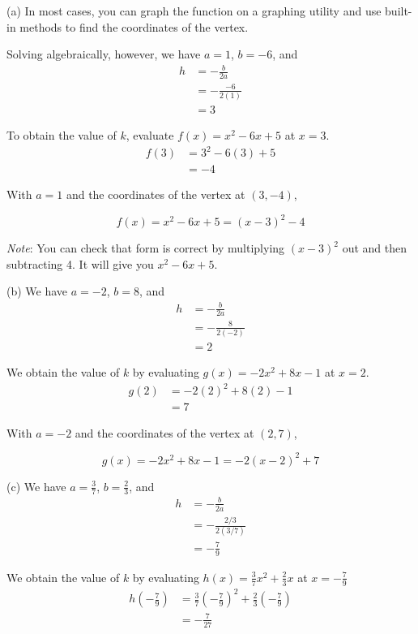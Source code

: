 \begin{solution}

(a) In most cases, you can graph the function on a graphing utility and use built-in methods to find the coordinates of the vertex. \newline 

Solving algebraically, however, we have $a = 1$, $b = -6$, and 
\begin{align*}
h &= -\tfrac{b}{2a} \\
&= -\tfrac{-6}{2(1)} \\
&= 3 
\end{align*}

To obtain the value of $k$, evaluate $f(x) = x^2 - 6x + 5$ at $x = 3$.
\begin{align*}
f(3) &= 3^2 - 6(3) + 5 \\
&= -4
\end{align*}

With $a = 1$ and the coordinates of the vertex at $(3, -4)$,

\[
f(x) = x^2 - 6x + 5 = \boxed{(x-3)^2-4}
\]

\emph{Note}: You can check that form is correct by multiplying $(x-3)^2$ out and then subtracting 4. It will give you $x^2-6x+5$. \newline 

(b) We have $a = -2$, $b = 8$, and 
\begin{align*}
h &= -\tfrac{b}{2a} \\
&= -\tfrac{8}{2(-2)} \\
&= 2
\end{align*}

We obtain the value of $k$ by evaluating $g(x) = -2x^2+8x-1$ at $x = 2$.
\begin{align*}
g(2) &= -2(2)^2 + 8(2) - 1 \\
&= 7
\end{align*}

With $a = -2$ and the coordinates of the vertex at $(2,7)$,

\[
g(x) = -2x^2+8x-1 = \boxed{-2(x-2)^2+7}
\]

(c) We have $a = \frac{3}{7}$, $b =\frac{2}{3}$, and 
\begin{align*}
h &= -\tfrac{b}{2a} \\
&= -\tfrac{2/3}{2\left(3/7\right)} \\
&= -\tfrac{7}{9}
\end{align*}

We obtain the value of $k$ by evaluating $h(x) = \frac{3}{7}x^2 + \frac{2}{3}x$ at $x = -\frac{7}{9}$
\begin{align*}
h\left(-\tfrac{7}{9}\right) &= \tfrac{3}{7}\left(-\tfrac{7}{9}\right)^2 + \tfrac{2}{3}\left(-\tfrac{7}{9}\right) \\
&= -\tfrac{7}{27}
\end{align*}


\end{solution}
